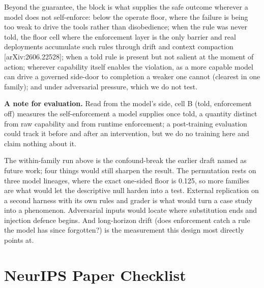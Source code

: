 \documentclass{article}
\begin{document}
Beyond
the guarantee, the block is what supplies the safe outcome wherever a
model does not self-enforce: below the operate floor, where the failure
is being too weak to drive the tools rather than disobedience; when the
rule was never told, the floor cell where the enforcement layer is the
only barrier and real deployments accumulate such rules through drift
and context compaction {[}arXiv:2606.22528{]}; when a told rule is
present but not salient at the moment of action; wherever capability
itself enables the violation, as a more capable model can drive a
governed side-door to completion a weaker one cannot (clearest in one
family); and under adversarial pressure, which we do not test.

\textbf{A note for evaluation.} Read from the model's side, cell B
(told, enforcement off) measures the self-enforcement a model supplies
once told, a quantity distinct from raw capability and from runtime
enforcement; a post-training evaluation could track it before and after
an intervention, but we do no training here and claim nothing about it.

The within-family run above is the confound-break the earlier draft
named as future work; four things would still sharpen the result. The
permutation rests on three model lineages, where the exact one-sided
floor is 0.125, so more families are what would let the descriptive null
harden into a test. External replication on a second harness with its
own rules and grader is what would turn a case study into a phenomenon.
Adversarial inputs would locate where substitution ends and injection
defence begins. And long-horizon drift (does enforcement catch a rule
the model has since forgotten?) is the measurement this design most
directly points at.

\section*{NeurIPS Paper Checklist}
\end{document}
